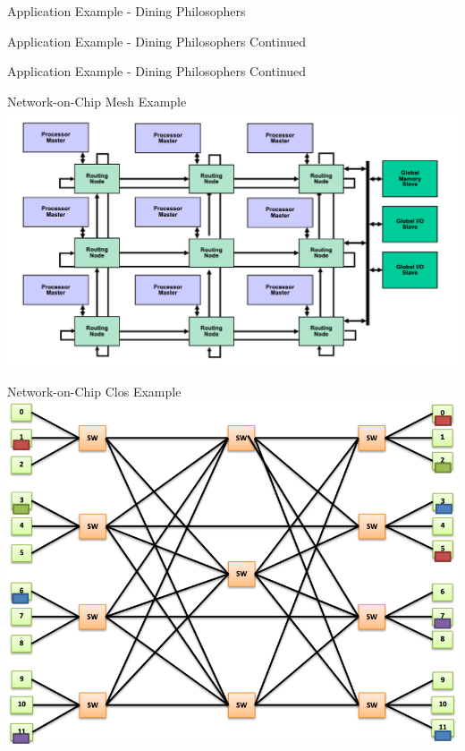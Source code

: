 \documentclass{beamer}
\begin{document}


\begin{frame}{Application Example - Dining Philosophers}
	\lstmain
	\lstphil
\end{frame}

\begin{frame}{Application Example - Dining Philosophers Continued}
	\lstroom
\end{frame}

\begin{frame}{Application Example - Dining Philosophers Continued}
	\lstforks
	\lstchan
\end{frame}

\begin{frame}{Network-on-Chip Mesh Example}
	\includegraphics[width=\linewidth]{noc-mesh-example.png}
\end{frame}

\begin{frame}{Network-on-Chip Clos Example}
	\includegraphics[width=\linewidth]{noc-clos-example.png}
\end{frame}
\end{document}
